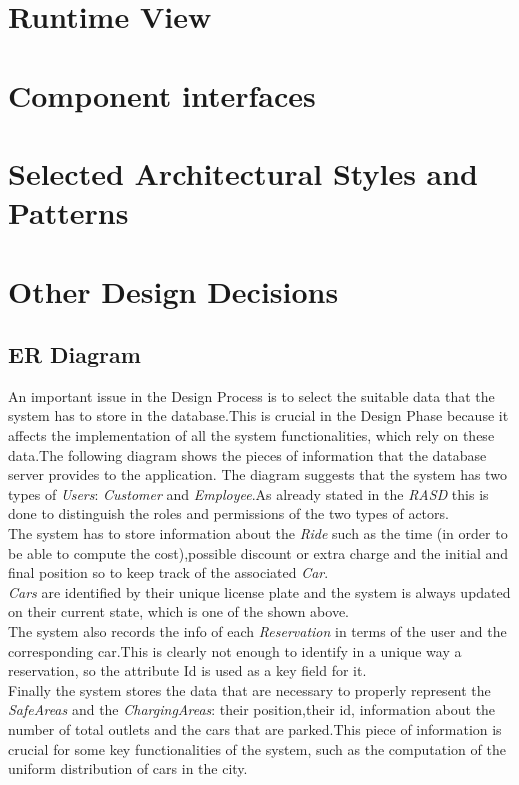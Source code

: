 \documentclass[11pt,a4paper]{report}
\begin{document}
\section{Runtime View}
\section{Component interfaces}
\section{Selected Architectural Styles and Patterns}
\section{Other Design Decisions}
\subsection{ER Diagram}
An important issue in the Design Process is to select the suitable data that the system has to store in the database.This is crucial in the Design Phase because it affects the implementation of all the system functionalities, which rely on these data.The following diagram shows the pieces of information that the database server provides to the application.
\noindent The diagram suggests that the system has two types of \textit{Users}: \textit{Customer} and \textit{Employee}.As already stated in the \textit{RASD} this is done to distinguish the roles and permissions of the two types of actors.\\The system has to store information about the \textit{Ride} such as the time (in order to be able to compute the cost),possible discount or extra charge and the initial and final position so to keep track of the associated \textit{Car}.\\\textit{Cars} are identified by their unique license plate and the system is always updated on their current state, which is one of the shown above.\\The system also records the info of each \textit{Reservation} in terms of the user and the corresponding car.This is clearly not enough to identify in a unique way a reservation, so the attribute Id is used as a key field for it.\\Finally the system stores the data that are necessary to properly represent the \textit{SafeAreas} and the \textit{ChargingAreas}: their position,their id, information about the number of total outlets and the cars that are parked.This piece of information is crucial for some key functionalities of the system, such as the computation of the uniform distribution of cars in the city.
\end{document}
